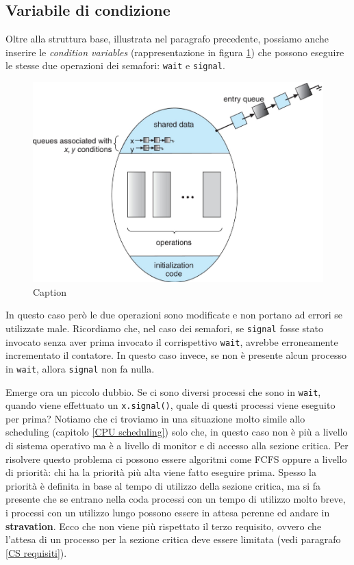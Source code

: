 \subsection{Variabile di condizione}
Oltre alla struttura base, illustrata nel paragrafo precedente, possiamo anche inserire le \textit{condition variables}  (rappresentazione in figura \ref{fig:condition_variable}) che possono eseguire le stesse due operazioni dei semafori: \texttt{wait} e \texttt{signal}.
\begin{figure}[!h]
    \centering
    \includegraphics[width = .65\textwidth]{../res/imgs/synchronization/condition_variable.png}
    \caption{Caption}
    \label{fig:condition_variable}
\end{figure}
In questo caso però le due operazioni sono modificate e non portano ad errori se utilizzate male. Ricordiamo che, nel caso dei semafori, se \texttt{signal} fosse stato invocato senza aver prima invocato il corrispettivo \texttt{wait}, avrebbe erroneamente incrementato il contatore. In questo caso invece, se non è presente alcun processo in \texttt{wait}, allora \texttt{signal} non fa nulla.

Emerge ora un piccolo dubbio. Se ci sono diversi processi che sono in \texttt{wait}, quando viene effettuato un \texttt{x.signal()}, quale di questi processi viene eseguito per prima? Notiamo che ci troviamo in una situazione molto simile allo scheduling (capitolo \ref{CPU scheduling}) solo che, in questo caso non è più a livello di sistema operativo ma è a livello di monitor e di accesso alla sezione critica. Per risolvere questo problema ci possono essere algoritmi come FCFS oppure a livello di priorità: chi ha la priorità più alta viene fatto eseguire prima. Spesso la priorità è definita in base al tempo di utilizzo della sezione critica, ma si fa presente che se entrano nella coda processi con un tempo di utilizzo molto breve, i processi con un utilizzo lungo possono essere in attesa perenne ed andare in \textbf{stravation}. Ecco che non viene più rispettato il terzo requisito, ovvero che l'attesa di un processo per la sezione critica deve essere limitata (vedi paragrafo \ref{CS requisiti}).
% 
